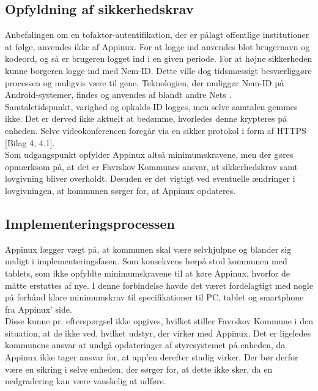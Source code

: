 \subsection{Opfyldning af sikkerhedskrav}
Anbefalingen om en tofaktor-autentifikation, der er pålagt offentlige institutioner at følge, anvendes ikke af Appinux. For at logge ind anvendes blot brugernavn og kodeord, og så er brugeren logget ind i en given periode. For at højne sikkerheden kunne borgeren logge ind med Nem-ID. Dette ville dog tidsmæssigt besværliggøre processen og muligvis være til gene. Teknologien, der muliggør Nem-ID på Android-systemer, findes og anvendes af blandt andre Nets \cite{netsapp}.\\
Samtaletidspunkt, varighed og opkalds-ID logges, men selve samtalen gemmes ikke. Det er derved ikke aktuelt at bedømme, hvorledes denne krypteres på enheden. Selve videokonferencen foregår via en sikker protokol i form af HTTPS [Bilag 4, 4.1].\\
Som udgangspunkt opfylder Appinux altså minimumskravene, men der gøres opmærksom på, at det er Favrskov Kommunes ansvar, at sikkerhedskrav samt lovgivning bliver overholdt. Desuden er det vigtigt ved eventuelle ændringer i lovgivningen, at kommunen sørger for, at Appinux opdateres.

\subsection{Implementeringsprocessen}
Appinux lægger vægt på, at kommunen skal være selvhjulpne og blander sig nødigt i implementeringsfasen. Som konsekvens herpå stod kommunen med tablets, som ikke opfyldte minimumskravene til at køre Appinux, hvorfor de måtte erstattes af nye. I denne forbindelse havde det været fordelagtigt med nogle på forhånd klare minimumskrav til specifikationer til PC, tablet og smartphone fra Appinux' side.\\Disse kunne pr. efterspørgsel ikke opgives, hvilket stiller Favrskov Kommune i den situation, at de ikke ved, hvilket udstyr, der virker med Appinux. Det er ligeledes kommunens ansvar at undgå opdateringer af styresystemet på enheden, da Appinux ikke tager ansvar for, at app'en derefter stadig virker. Der bør derfor være en sikring i selve enheden, der sørger for, at dette ikke sker, da en nedgradering kan være vanskelig at udføre.
